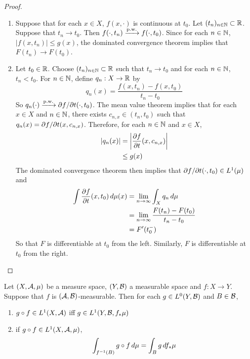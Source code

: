\documentclass{book}
\begin{document}
	\begin{proof}\
	\begin{enumerate}
	\item Suppose that for each $x \in X$, $f(x, \cdot)$ is continuous at $t_0$. Let $(t_n)_{n \in \mathbb{N}} \subset \mathbb{R}$. Suppose that $t_n \rightarrow t_0$. Then $f(\cdot , t_n) \xrightarrow{\text{p.w.}} f(\cdot, t_0)$. Since for each $n \in \mathbb{N}$, $|f(x,t_n)| \leq g(x)$, the dominated convergence theorem implies that $F(t_n) \rightarrow F(t_0)$.
	\item Let $t_0 \in \mathbb{R}$. Choose $(t_n)_{n \in \mathbb{N}} \subset \mathbb{R}$ such that $ t_n \rightarrow t_0$ and for each $n \in \mathbb{N}$, $t_n < t_0$. For $n \in \mathbb{N}$, define $q_n:X \rightarrow \mathbb{R}$ by $$q_n(x) = \frac{f(x,t_n) - f(x, t_0)}{t_n - t_0}$$ So $q_n(\cdot) \xrightarrow{\text{p.w.}} \partial f / \partial t (\cdot, t_0)$. The mean value theorem implies that for each $x \in X$ and $n \in \mathbb{N}$, there exists $c_{n,x} \in (t_n,t_0)$ such that $q_n(x) = \partial f / \partial t (x, c_{n,x})$. Therefore, for each $n \in \mathbb{N}$ and $x \in X$, 
	\begin{align*}
		|q_n(x)| 
		& = \bigg | \frac{\partial f}{\partial t}(x, c_{n,x}) \bigg| \\
		& \leq g(x)
	\end{align*}
	The dominated convergence theorem then implies that $\partial f / \partial t (\cdot, t_0) \in L^1(\mu)$ and 
	\begin{align*}
	\int \frac{\partial f }{\partial t} (x, t_0) \, d \mu(x) 
	&=  \lim \limits_{n \rightarrow \infty} \int_X q_n \, d \mu  \\
	&= \lim \limits_{n \rightarrow \infty} \frac{F(t_n) - F(t_0)}{t_n - t_0} \\
	&= F'(t_0^-) 	
	\end{align*}
	So that $F$ is differentiable at $t_0$ from the left. Similarly, $F$ is differentiable at $t_0$ from the right. 
	\end{enumerate}
	\end{proof}

	\begin{ex} 
		Let $(X, \mathcal{A}, \mu)$ be a measure space, $(Y, \mathcal{B})$ a measurable space and $f: X \rightarrow Y$. Suppose that $f$ is $(\mathcal{A}, \mathcal{B})$-measurable. Then for each $g \in L^0(Y, \mathcal{B})$ and $B \in \mathcal{B}$, 
		\begin{enumerate}
			\item $g \circ f \in L^1(X, \mathcal{A})$ iff $g \in L^1(Y, \mathcal{B}, f_* \mu)$
			\item if $g \circ f \in L^1(X, \mathcal{A}, \mu)$, 
			$$\int_{f^{-1}(B)} g \circ f \, d \mu = \int_B g \, d f_*\mu$$
		\end{enumerate}
	\end{ex}
\end{document}
